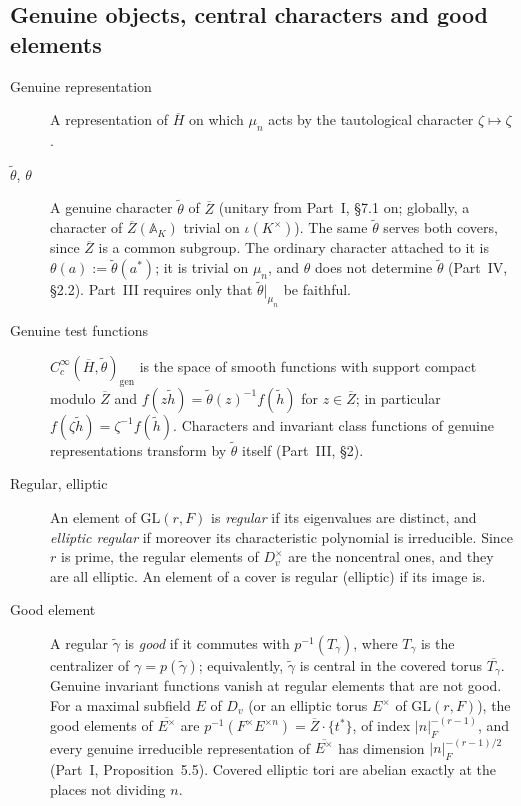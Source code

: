 \subsection{Genuine objects, central characters and good elements}\label{gl:genuine}
\begin{description}
\item[Genuine representation] A representation of $\overline H$ on
which $\mu_n$ acts by the tautological character $\zeta\mapsto\zeta$.
\item[$\tilde\theta$, $\theta$] A genuine character $\tilde\theta$ of
$\overline Z$ (unitary from Part~I, \S7.1 on; globally, a character of
$\overline Z(\mathbb A_K)$ trivial on $\iota(K^\times)$).  The same
$\tilde\theta$ serves both covers, since $\overline Z$ is a common
subgroup.  The ordinary character attached to it is
$\theta(a):=\tilde\theta(a^*)$; it is trivial on $\mu_n$, and
$\theta$ does not determine $\tilde\theta$ (Part~IV, \S2.2).
Part~III requires only that $\tilde\theta|_{\mu_n}$ be faithful.
\item[Genuine test functions] $C_c^\infty(\overline H,\tilde\theta)_{\mathrm{gen}}$
is the space of smooth functions with support compact modulo
$\overline Z$ and $f(z\tilde h)=\tilde\theta(z)^{-1}f(\tilde h)$ for
$z\in\overline Z$; in particular $f(\zeta\tilde h)=\zeta^{-1}f(\tilde h)$.
Characters and invariant class functions of genuine representations
transform by $\tilde\theta$ itself (Part~III, \S2).
\item[Regular, elliptic] An element of $\mathrm{GL}(r,F)$ is
\emph{regular} if its eigenvalues are distinct, and \emph{elliptic
regular} if moreover its characteristic polynomial is irreducible.
Since $r$ is prime, the regular elements of $D_v^\times$ are the
noncentral ones, and they are all elliptic.  An element of a cover is
regular (elliptic) if its image is.
\item[Good element] A regular $\tilde\gamma$ is \emph{good} if it
commutes with $p^{-1}(T_\gamma)$, where $T_\gamma$ is the centralizer
of $\gamma=p(\tilde\gamma)$; equivalently, $\tilde\gamma$ is central
in the covered torus $\overline{T_\gamma}$.  Genuine invariant
functions vanish at regular elements that are not good.  For a
maximal subfield $E$ of $D_v$ (or an elliptic torus $E^\times$ of
$\mathrm{GL}(r,F)$), the good elements of $\overline{E^\times}$ are
$p^{-1}(F^\times E^{\times n})=\overline Z\cdot\{t^*\}$, of index
$|n|_F^{-(r-1)}$, and every genuine irreducible representation of
$\overline{E^\times}$ has dimension $|n|_F^{-(r-1)/2}$ (Part~I,
Proposition~5.5).  Covered elliptic tori are abelian exactly at the
places not dividing $n$.
\end{description}

